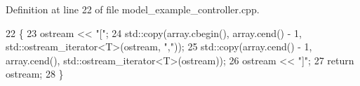 Definition at line 22 of file model\+\_\+example\+\_\+controller.\+cpp.


\begin{DoxyCode}
22                                                                          \{
23   ostream << \textcolor{stringliteral}{"["};
24   std::copy(array.cbegin(), array.cend() - 1, std::ostream\_iterator<T>(ostream, \textcolor{stringliteral}{","}));
25   std::copy(array.cend() - 1, array.cend(), std::ostream\_iterator<T>(ostream));
26   ostream << \textcolor{stringliteral}{"]"};
27   \textcolor{keywordflow}{return} ostream;
28 \}
\end{DoxyCode}
